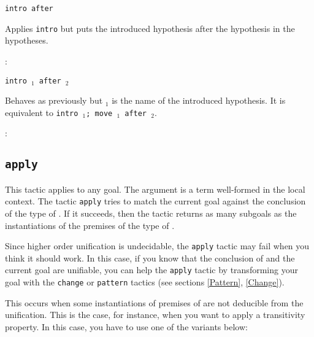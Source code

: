 \begin{Variants}
\item {\tt intro after \ident} 

  Applies {\tt intro} but puts the introduced
  hypothesis after the hypothesis \ident{} in the hypotheses.

\begin{ErrMsgs}
\item {}
\item {} : {\ident}
\end{ErrMsgs}

\item {\tt intro \ident$_1$ after \ident$_2$}
  
  Behaves as previously but \ident$_1$ is the name of the introduced
  hypothesis.  It is equivalent to {\tt intro \ident$_1$; move
    \ident$_1$ after \ident$_2$}.

\begin{ErrMsgs}
\item {}
\item {} : {\ident}
\end{ErrMsgs}

\end{Variants}

\subsection{\tt apply \term}
\label{apply}

This tactic applies to any goal.  The argument {\term} is a term
well-formed in the local context.  The tactic {\tt apply} tries to
match the current goal against the conclusion of the type of {\term}.
If it succeeds, then the tactic returns as many subgoals as the
instantiations of the premises of the type of {\term}.

\begin{ErrMsgs}
\item {} 

  Since higher order unification is undecidable, the {\tt apply}
  tactic may fail when you think it should work.  In this case, if you
  know that the conclusion of {\term} and the current goal are
  unifiable, you can help the {\tt apply} tactic by transforming your
  goal with the {\tt change} or {\tt pattern} tactics (see sections
  \ref{Pattern}, \ref{Change}).

\item {}

  This occurs when some instantiations of premises of {\term} are not
  deducible from the unification. This is the case, for instance, when
  you want to apply a transitivity property. In this case, you have to
  use one of the variants below:

\end{ErrMsgs}


